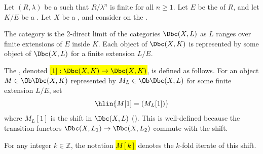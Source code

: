 \begin{definition} \label{definition:shift_functor_on_bdd_constructible_derived_category_with_algebraic_adic_coefficients_on_a_noetherian_scheme}
Let $(R, \lambda)$ be a   such that $R/\lambda^n$ is finite for all $n \geq 1$. Let $E$ be the  of $R$, and let $K/E$ be a . Let $X$ be a , and consider  on the .

The category  is the 2-direct limit of the categories $\Dbc(X, L)$ as $L$ ranges over finite extensions of $E$ inside $K$. Each object of $\Dbc(X, K)$ is represented by some object of $\Dbc(X, L)$ for a finite extension $L/E$.

The , denoted \hl{$[1]: \Dbc(X, K) \to \Dbc(X, K)$}, is defined as follows. For an object $M \in \Ob \Dbc(X, K)$ represented by $M_L \in \Ob \Dbc(X, L)$ for some finite extension $L/E$, set
$$\hlin{M[1] = (M_L[1])}$$
where $M_L[1]$ is the shift in $\Dbc(X, L)$ (). This is well-defined because the transition functors $\Dbc(X, L_1) \to \Dbc(X, L_2)$ commute with the shift.

For any integer $k \in \mathbb{Z}$, the notation \hl{$M[k]$} denotes the $k$-fold iterate of this shift.

\end{definition}